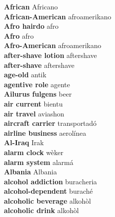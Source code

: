 \textbf{ African  } Africano \\
\textbf{ African-American  } afroamerikano \\
\textbf{ Afro hairdo  } afro \\
\textbf{ Afro  } afro \\
\textbf{ Afro-American  } afroamerikano \\
\textbf{ after-shave lotion  } aftershave \\
\textbf{ after-shave  } aftershave \\
\textbf{ age-old  } antik \\
\textbf{ agentive role  } agente \\
\textbf{ Ailurus fulgens  } beer \\
\textbf{ air current  } bientu \\
\textbf{ air travel  } aviashon \\
\textbf{ aircraft carrier  } transportadó \\
\textbf{ airline business  } aerolínea \\
\textbf{ Al-Iraq  } Irak \\
\textbf{ alarm clock  } wèker \\
\textbf{ alarm system  } alarmá \\
\textbf{ Albania  } Albania \\
\textbf{ alcohol addiction  } buracheria \\
\textbf{ alcohol-dependent  } buraché \\
\textbf{ alcoholic beverage  } alkohòl \\
\textbf{ alcoholic drink  } alkohòl \\
